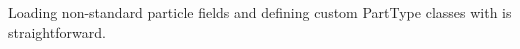 \label{fig:custom_ptype}
Loading non-standard particle fields and defining custom PartType classes with  is straightforward.